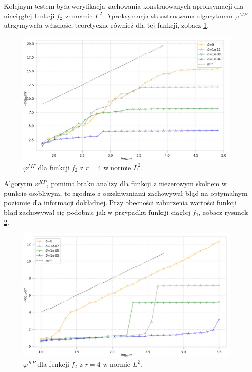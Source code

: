 \documentclass[oik, pdftex, man]{mgrwms}
\begin{document}
    Kolejnym testem była weryfikacja zachowania konstruowanych aproksymacji dla nieciągłej funkcji $f_{2}$ w normie $L^{2}$. Aproksymacja skonstruowana algorytmem $\varphi^{MP}$ utrzymywała własności teoretyczne również dla tej funkcji, zobacz \ref{rys:5}.
    \begin{figure}
        \centering
        \includegraphics[width=.9\linewidth]{alg2015/f_2/r_4/p_2/plot_30evaluation_0.jpg}
        \caption{$\varphi^{MP}$ dla funkcji $f_{2}$ z $r = 4$ w normie $L^{2}$.}
        \label{rys:5}
    \end{figure}

    Algorytm $\varphi^{KP}$, pomimo braku analizy dla funkcji z niezerowym skokiem w punkcie osobliwym, to zgodnie z oczekiwaniami zachowywał błąd na optymalnym poziomie dla informacji dokładnej. Przy obecności zaburzenia wartości funkcji błąd zachowywał się podobnie jak w przypadku funkcji ciągłej $f_{1}$, zobacz rysunek \ref{rys:6}.
    \begin{figure}
        \centering
        \includegraphics[width=.9\linewidth]{alg2014mp/f_2/r_3/p_2/plot_30evaluation_0.jpg}
        \caption{$\varphi^{KP}$ dla funkcji $f_{2}$ z $r = 4$ w normie $L^{2}$.}
        \label{rys:6}
    \end{figure}
\end{document}
